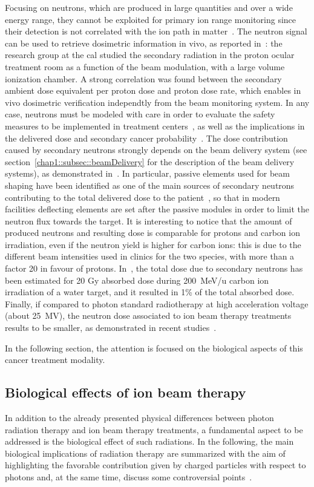 Focusing on neutrons, which are produced in large quantities and over a wide energy range, they cannot be exploited for primary ion range monitoring since their detection is not correlated with the ion path in matter~\parencite{Testa2010}. The neutron signal can be used to retrieve dosimetric information in vivo, as reported in~\cite{Carnicer2014}: the research group at the \gls{cal} studied the secondary radiation in the proton ocular treatment room as a  function of the beam modulation, with a large volume ionization chamber. A strong correlation was found between the secondary ambient dose equivalent per proton dose and proton dose rate, which enables in vivo dosimetric verification independtly from the beam monitoring system. In any case, neutrons must be modeled with care in order to evaluate the safety measures to be implemented in treatment centers~\parencite{Newhauser2002}, as well as the implications in the delivered dose and secondary cancer probability~\parencite{Newhauser2011}. The dose contribution caused by secondary neutrons strongly depends on the beam delivery system (see section~\ref{chap1::subsec::beamDelivery} for the description of the beam delivery systems), as demonstrated in~\cite{Gottschalk2006}. In particular, passive elements used for beam shaping have been identified as one of the main sources of secondary neutrons contributing to the total delivered dose to the patient~\parencite{Yan2002}, so that in modern facilities deflecting elements are set after the passive modules in order to limit the neutron flux towards the target. It is interesting to notice that the amount of produced neutrons and resulting dose is comparable for protons and carbon ion irradiation, even if the neutron yield is higher for carbon ions: this is due to the different beam intensities used in clinics for the two species, with more than a factor 20 in favour of protons. In~\cite{Gunzert-Marx2008}, the total dose due to secondary neutrons has been estimated for 20 Gy absorbed dose during 200~MeV/u carbon ion irradiation of a water target, and it resulted in 1\% of the total absorbed dose. Finally, if compared to photon standard radiotherapy at high acceleration voltage (about 25~MV), the neutron dose associated to ion beam therapy treatments results to be smaller, as demonstrated in recent studies~\parencite{LaTessa2012, Schneider2015}. 

In the following section, the attention is focused on the biological aspects of this cancer treatment modality.


\subsection{Biological effects of ion beam therapy}\label{chap1::subsec::bioEffects} 
In addition to the already presented physical differences between photon radiation therapy and ion beam therapy treatments, a fundamental aspect to be addressed is the biological effect of such radiations. In the following, the main biological implications of radiation therapy are summarized with the aim of highlighting the favorable contribution given by charged particles with respect to photons and, at the same time, discuss some controversial points~\parencite{Paganetti2013}.

